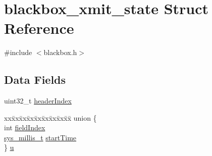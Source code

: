\hypertarget{structblackbox__xmit__state}{\section{blackbox\+\_\+xmit\+\_\+state Struct Reference}
\label{structblackbox__xmit__state}
}


{\ttfamily \#include $<$blackbox.\+h$>$}

\subsection*{Data Fields}
\begin{DoxyCompactItemize}
\item 
uint32\+\_\+t \hyperlink{structblackbox__xmit__state_ae9bcfe3cb206e5d8008bc2ee38b7f9e0}{header\+Index}
\item 
\begin{tabbing}
xx\=xx\=xx\=xx\=xx\=xx\=xx\=xx\=xx\=\kill
union \{\\
\>int \hyperlink{structblackbox__xmit__state_a799e14f5ef793fb5de9720a34e8558d7}{fieldIndex}\\
\>\hyperlink{system__calls_8h_a62a9a2e72861132c17d4d4b29bb8b80a}{sys\_millis\_t} \hyperlink{structblackbox__xmit__state_a2c026b835cae3d13bfb9149d59319faf}{startTime}\\
\} \hyperlink{structblackbox__xmit__state_ae06a0e2caa63f3450902c198b6c5ba20}{u}\\

\end{tabbing}\end{DoxyCompactItemize}


